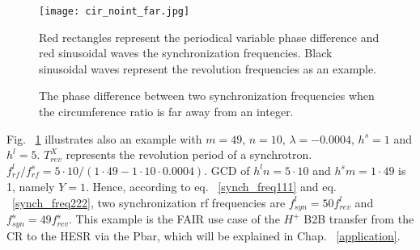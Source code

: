\begin{figure}[!htb]
   \centering   
   \texttt{[image: cir\_noint\_far.jpg]}
   \caption{The phase difference between two synchronization frequencies when the circumference ratio is far away from an integer.}{Red rectangles represent the periodical variable phase difference and red sinusoidal waves the synchronization frequencies. Black sinusoidal waves represent the revolution frequencies as an example.}
   \label{cir_noint_far}
\end{figure} 






Fig. ~\ref{cir_noint_far} illustrates also an example with $m=49$, $n=10$, $\lambda=-0.0004$, $h^s=1$ and $h^l=5$. $T_{\mathit{rev}}^{X}$ represents the revolution period of a synchrotron. $f_{\mathit{rf}}^{l}/f_{\mathit{rf}}^{s}=5\cdot 10/(1\cdot49-1\cdot10\cdot0.0004)$. GCD of $h^ln=5\cdot10$ and $h^s m=1\cdot49$ is 1, namely $Y=1$. Hence, according to eq. ~\ref{synch_freq111} and eq. ~\ref{synch_freq222}, two synchronization rf frequencies are $f_{\mathit{syn}}^{l}=50f_{\mathit{rev}}^{l}$ and $f_{\mathit{syn}}^{s}=49f_{\mathit{rev}}^{s}$. This example is the FAIR use case of the $H^+$ B2B transfer from the CR to the HESR via the Pbar, which will be explained in Chap. ~\ref{application}.   

%

  

